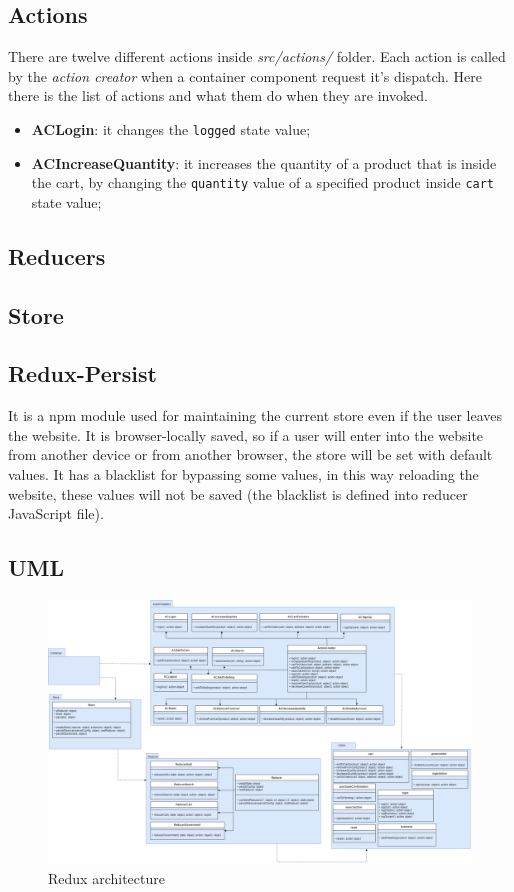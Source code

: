 \subsection{Actions}
There are twelve different actions inside \textit{src/actions/} folder. Each action is called by the \textit{action creator} when a container component request it's dispatch. Here there is the list of actions and what them do when they are invoked.
\begin{itemize}
	\item \textbf{ACLogin}: it changes the \texttt{logged} state value;
	\item \textbf{ACIncreaseQuantity}: it increases the quantity of a product that is inside the cart, by changing the \texttt{quantity} value of a specified product inside \texttt{cart} state value;
\end{itemize}
\subsection{Reducers}

\subsection{Store}

\subsection{Redux-Persist}
It is a npm module used for maintaining the current store even if the user leaves the website. It is browser-locally saved, so if a user will enter into the website from another device or from another browser, the store will be set with default values. It has a blacklist for bypassing some values, in this way reloading the website, these values will not be saved (the blacklist is defined into reducer JavaScript file).

\begin{landscape}
\subsection{UML} 

\begin{figure}[H]
	\centering\includegraphics[scale = 0.3]{res/images/ReduxDiagram.png}
	\caption{Redux architecture}
\end{figure}
\end{landscape}